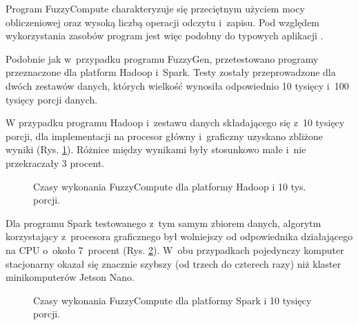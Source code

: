 Program FuzzyCompute charakteryzuje się przeciętnym użyciem mocy obliczeniowej oraz wysoką liczbą 
operacji odczytu i~zapisu. Pod względem wykorzystania zasobów program jest więc podobny do typowych
aplikacji .

Podobnie jak w~przypadku programu FuzzyGen, przetestowano programy przeznaczone dla platform Hadoop i~Spark.
Testy zostały przeprowadzone dla dwóch zestawów danych, których wielkość wynosiła odpowiednio
10 tysięcy i~100 tysięcy porcji danych.

W przypadku programu Hadoop i~zestawu danych składającego się z~10 tysięcy porcji, dla implementacji
na procesor główny i~graficzny uzyskano zbliżone wyniki (Rys. \ref{fig:fuzzycompute:hadoop:10K}).
Różnice między wynikami były stosunkowo małe i~nie przekraczały 3 procent.

\begin{figure}[h]
    \centering
    \caption{Czasy wykonania FuzzyCompute dla platformy Hadoop i 10 tys. porcji.}
    \label{fig:fuzzycompute:hadoop:10K}
\end{figure}
\newpage

Dla programu Spark testowanego z~tym samym zbiorem danych, algorytm korzystający z~procesora graficznego
był wolniejszy od odpowiednika działającego na CPU o~około 7~procent (Rys. \ref{fig:fuzzycompute:spark:10K}).
W~obu przypadkach pojedynczy komputer stacjonarny okazał się znacznie szybszy (od trzech do czterech razy) niż
klaster minikomputerów Jetson Nano.

\begin{figure}[h]
    \centering
    \caption{Czasy wykonania FuzzyCompute dla platformy Spark i 10 tysięcy porcji.}
    \label{fig:fuzzycompute:spark:10K}
\end{figure}

